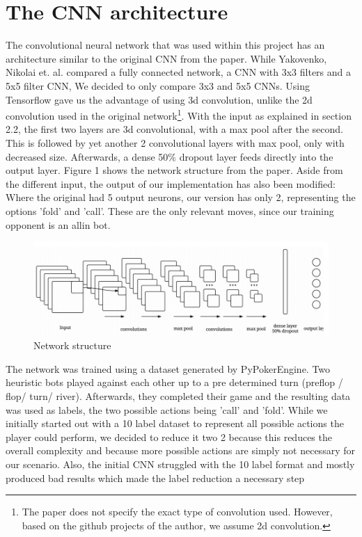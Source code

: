 \documentclass[]{report}
\begin{document}
\section{The CNN architecture \label{see:CNN_arc} }

The convolutional neural network that was used within this project has an architecture similar to the original CNN from the paper\cite{1}. While Yakovenko, Nikolai et. al. compared a fully connected network, a CNN with 3x3 filters and a 5x5 filter CNN, We decided to only compare 3x3 and 5x5 CNNs. Using Tensorflow gave us the advantage of using 3d convolution, unlike the 2d convolution used in the original network\footnote{The paper does not specify the exact type of convolution used. However, based on the github projects of the author, we assume 2d convolution.}. With the input as explained in section 2.2, the first two layers are 3d convolutional, with a max pool after the second. This is followed by yet another 2 convolutional layers with max pool, only with decreased size. 
Afterwards, a dense 50\% dropout layer feeds directly into the output layer. Figure 1 shows the network structure from the paper. Aside from the different input, the output of our implementation has also been modified: Where the original had 5 output neurons, our version has only 2, representing the options 'fold' and 'call'. These are the only relevant moves, since our training opponent is an allin bot.


\begin{figure}[h]
	\caption{Network structure}
	\includegraphics[scale = 0.5]{cnn_structure.jpg}
\end{figure}

The network was trained using a dataset generated by PyPokerEngine. Two heuristic bots played against each other up to a pre determined turn (preflop / flop/ turn/ river). Afterwards, they completed their game and the resulting data was used as labels, the two possible actions being 'call' and 'fold'. While we initially started out with a 10 label dataset to represent all possible actions the player could perform, we decided to reduce it two 2 because this reduces the overall complexity and because more possible actions are simply not necessary for our scenario. Also, the initial CNN struggled with the 10 label format and mostly produced bad results which made the label reduction a necessary step
\end{document}
